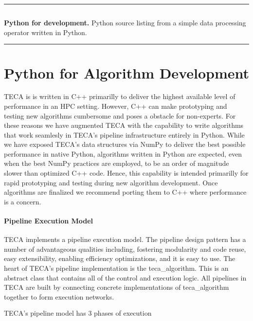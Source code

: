 \documentclass[a4paper,10pt,DIV=12]{scrreprt}
\begin{document}
\begin{listing}[p]
\begin{center}
\hrule\vspace{1mm}
\begin{minipage}{0.8\textwidth}
\inputminted[bgcolor=White, fontsize=\footnotesize, linenos]{python}{source/python_for_devel.py}
\caption{{\bf Python for development.} Python source listing from a simple data processing operator written in Python.}
\label{code:py_devel}
\end{minipage}
\hrule
\end{center}
\end{listing}

\section{Python for Algorithm Development}
\label{sec:py_devel}
TECA is is written in C++ primarilly to deliver the highest available level of performance in an HPC setting. However, C++ can make prototyping and testing new algorithms cumbersome and poses a obstacle for non-experts. For these reasons we have augmented TECA with the capability to write algorithms that work seamlesly in TECA's pipeline infrastructure entirely in Python. While we have exposed TECA's data structures via NumPy to deliver the best possible performance in native Python, algorithms written in Python are expected, even when the best NumPy practices are employed, to be an order of magnitude slower than optimized C++ code. Hence, this capability is intended primarilly for rapid prototyping and testing during new algorithm development. Once algorithms are finalized we recommend porting them to C++ where performance is a concern.

\paragraph{Pipeline Execution Model}
TECA implements a pipeline execution model. The pipeline design pattern has a number of advantageous qualities including, fostering modularity and code reuse, easy extensibility, enabling efficiency optimizations, and it is easy to use. The heart of TECA's pipeline implementation is the teca\_algorithm. This is an abstract class that contains all of the control and execution logic. All pipelines in TECA are built by connecting concrete implementations of teca\_algorithm together to form execution networks.

TECA's pipeline model has 3 phases of execution
\end{document}
